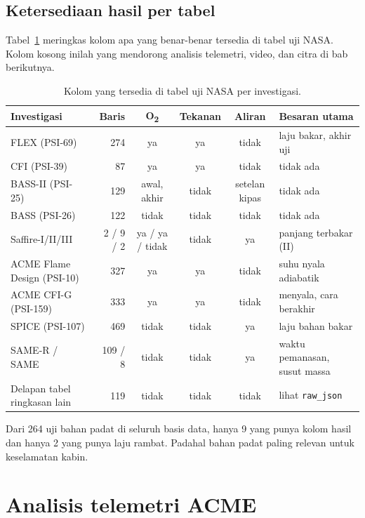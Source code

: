 \documentclass[11pt,a4paper]{report}
\newcommand{\Od}{O\textsubscript{2}}
\begin{document}
\section{Ketersediaan hasil per tabel}

Tabel~\ref{tab:ketersediaan} meringkas kolom apa yang benar-benar tersedia di tabel uji NASA.
Kolom kosong inilah yang mendorong analisis telemetri, video, dan citra di bab berikutnya.

\begin{table}[ht]
\centering\footnotesize
\caption{Kolom yang tersedia di tabel uji NASA per investigasi.}
\label{tab:ketersediaan}
\begin{tabularx}{\linewidth}{@{}>{\raggedright\arraybackslash}X r c c c >{\raggedright\arraybackslash}X@{}}
\toprule
Investigasi & Baris & \Od & Tekanan & Aliran & Besaran utama\\
\midrule
FLEX (PSI-69) & 274 & ya & ya & tidak & laju bakar, akhir uji\\
CFI (PSI-39) & 87 & ya & ya & tidak & tidak ada\\
BASS-II (PSI-25) & 129 & awal, akhir & tidak & setelan kipas & tidak ada\\
BASS (PSI-26) & 122 & tidak & tidak & tidak & tidak ada\\
Saffire-I/II/III & 2 / 9 / 2 & ya / ya / tidak & tidak & ya & panjang terbakar (II)\\
ACME Flame Design (PSI-10) & 327 & ya & ya & tidak & suhu nyala adiabatik\\
ACME CFI-G (PSI-159) & 333 & ya & ya & tidak & menyala, cara berakhir\\
SPICE (PSI-107) & 469 & tidak & tidak & ya & laju bahan bakar\\
SAME-R / SAME & 109 / 8 & tidak & tidak & ya & waktu pemanasan, susut massa\\
Delapan tabel ringkasan lain & 119 & tidak & tidak & tidak & lihat \texttt{raw\_json}\\
\bottomrule
\end{tabularx}
\end{table}

Dari 264 uji bahan padat di seluruh basis data, hanya 9 yang punya kolom hasil dan hanya 2 yang
punya laju rambat. Padahal bahan padat paling relevan untuk keselamatan kabin.

\chapter{Analisis telemetri ACME}\label{bab:telemetri}
\end{document}
